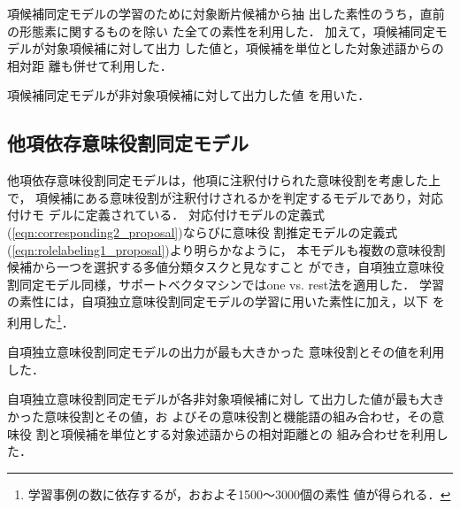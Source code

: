 \documentclass[japanese]{jnlp_1.2b}
\begin{document}
\begin{description}
 \setlength{\itemindent}{-6mm}
 \item[対象項候補の素性] $\;$\\
		       項候補同定モデルの学習のために対象断片候補から抽
		       出した素性のうち，直前の形態素に関するものを除い
		       た全ての素性を利用した．
		       加えて，項候補同定モデルが対象項候補に対して出力
		       した値と，項候補を単位とした対象述語からの相対距
		       離も併せて利用した．
 \item[非対象項候補の素性] $\;$\\
		       項候補同定モデルが非対象項候補に対して出力した値
		       を用いた．
\end{description}




\subsection{他項依存意味役割同定モデル}
\label{sec:proposal_srt_dep}


他項依存意味役割同定モデルは，他項に注釈付けられた意味役割を考慮した上で，
項候補にある意味役割が注釈付けされるかを判定するモデルであり，対応付けモ
デルに定義されている．
対応付けモデルの定義式(\ref{eqn:corresponding2_proposal})ならびに意味役
割推定モデルの定義式(\ref{eqn:rolelabeling1_proposal})より明らかなように，
本モデルも複数の意味役割候補から一つを選択する多値分類タスクと見なすこと
ができ，自項独立意味役割同定モデル同様，サポートベクタマシンではone
vs. rest法を適用した．
学習の素性には，自項独立意味役割同定モデルの学習に用いた素性に加え，以下
を利用した\footnote{学習事例の数に依存するが，おおよそ1500〜3000個の素性
値が得られる．}．

\begin{description}
 \setlength{\itemindent}{-6mm}
 \item[対象項候補の素性] $\;$\\
		       自項独立意味役割同定モデルの出力が最も大きかった
		       意味役割とその値を利用した．
 \item[非対象項候補の素性] $\;$\\
		       自項独立意味役割同定モデルが各非対象項候補に対し
		       て出力した値が最も大きかった意味役割とその値，お
		       よびその意味役割と機能語の組み合わせ，その意味役
		       割と項候補を単位とする対象述語からの相対距離との
		       組み合わせを利用した．
\end{description}
\end{document}
